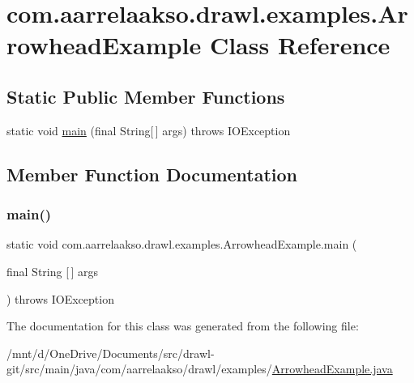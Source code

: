 \hypertarget{classcom_1_1aarrelaakso_1_1drawl_1_1examples_1_1_arrowhead_example}{}\section{com.\+aarrelaakso.\+drawl.\+examples.\+Arrowhead\+Example Class Reference}
\label{classcom_1_1aarrelaakso_1_1drawl_1_1examples_1_1_arrowhead_example}
\subsection*{Static Public Member Functions}
\begin{DoxyCompactItemize}
\item 
static void \hyperlink{classcom_1_1aarrelaakso_1_1drawl_1_1examples_1_1_arrowhead_example_ad77c13fdb08b2be4a9517048463ba379}{main} (final String\mbox{[}$\,$\mbox{]} args)  throws I\+O\+Exception 
\end{DoxyCompactItemize}


\subsection{Member Function Documentation}
\mbox{\label{classcom_1_1aarrelaakso_1_1drawl_1_1examples_1_1_arrowhead_example_ad77c13fdb08b2be4a9517048463ba379}} 
\subsubsection{\texorpdfstring{main()}{main()}}
{\footnotesize\ttfamily static void com.\+aarrelaakso.\+drawl.\+examples.\+Arrowhead\+Example.\+main (\begin{DoxyParamCaption}\item[{final String \mbox{[}$\,$\mbox{]}}]{args }\end{DoxyParamCaption}) throws I\+O\+Exception\hspace{0.3cm}{\ttfamily [static]}}



The documentation for this class was generated from the following file\+:\begin{DoxyCompactItemize}
\item 
/mnt/d/\+One\+Drive/\+Documents/src/drawl-\/git/src/main/java/com/aarrelaakso/drawl/examples/\hyperlink{_arrowhead_example_8java}{Arrowhead\+Example.\+java}\end{DoxyCompactItemize}
